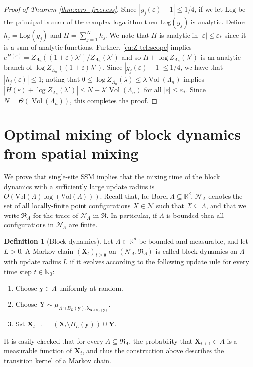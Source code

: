 \documentclass[10pt]{amsart}
\theoremstyle{definition}
\newtheorem{definition}[theorem]{Definition}
\theoremstyle{remark}
\def\eps{{\varepsilon}}
\newcommand{\pointsets}{\mathcal{N}}
\newcommand{\events}{\mathfrak{R}}
\newcommand{\bX}{\mathbf{X}}
\newcommand{\bY}{\mathbf{Y}}
\newcommand{\Vol}{\operatorname{Vol}}
\newcommand{\N}{\mathbb{N}}
\newcommand{\R}{\mathbb{R}}
\newcommand{\region}{\Lambda}
\newcommand{\activities}{\pmb{\lambda}}
\newcommand{\vol}{\mathrm{Vol}}
\newcommand{\randpoint}{\mathbf{y}}
\begin{document}
\begin{proof}[Proof of Theorem \ref{thm:zero_freeness}]
		Since $|g_j(\eps) - 1| \leq 1/4$, if we let $\mathrm{Log}$ be the principal branch of the complex logarithm then $\mathrm{Log}(g_j)$ is analytic. Define $h_j = \mathrm{Log}(g_j)$ and $H = \sum_{j = 1}^N h_j$.  We note that $H$ is analytic in $|\eps| \leq \eps_\ast$ since it is a sum of analytic functions.  Further, \eqref{eq:Z-telescope} implies $e^{H(\eps)}  =Z_{\Lambda_n}((1 + \eps)\lambda')/Z_{\Lambda_n}(\lambda')$ and so $H + \log Z_{\Lambda_n}(\lambda')$ is an analytic branch of $\log Z_{\Lambda_n}((1 + \eps)\lambda')$.  Since $|g_j(\eps) - 1| \leq 1/4$, we have that $|h_j(\eps)| \leq 1$; noting that $0 \leq \log Z_{\Lambda_n}(\lambda) \leq \lambda \Vol(\Lambda_n)$ implies $|H(\eps) + \log Z_{\Lambda_n}(\lambda')| \leq N + \lambda'\Vol(\Lambda_n)$ for all $|\eps| \leq \eps_\ast$.  Since $N = \Theta(\Vol(\Lambda_n))$, this completes the proof.
	\end{proof}
	
	\section{Optimal mixing of block dynamics from spatial mixing}\label{sec:block-dynamics}
	We prove that single-site SSM implies that the mixing time of the block dynamics with a sufficiently large update radius is $O(\vol(\region) \log(\vol(\region)))$.  
	Recall that, for Borel $\region \subseteq \R^d$, $\pointsets_{\region}$ denotes the set of all locally-finite point configurations $X \in \pointsets$ such that $X \subseteq \Lambda$, and that we write $\events_{\region}$ for the trace of $\pointsets_{\region}$ in $\events$.
	In particular, if $\region$ is bounded then all configurations in $\pointsets_{\region}$ are finite.
	
	
	
	
	\begin{definition}[Block dynamics] \label{def:block_dynamics}
		Let $\region \subset \R^d$ be bounded and measurable, and let $L > 0$.
		A Markov chain $(\bX_t)_{t \ge 0}$ on $(\pointsets_{\region}, \events_{\region})$ is called block dynamics on $\region$ with update radius $L$ if it evolves according to the following update rule for every time step $t \in \N_0$:
		\begin{enumerate}
			\item Choose $\randpoint \in \region$ uniformly at random.
			\item Choose $\bY \sim \mu_{\region \cap B_L(\randpoint), \activities_{\bX_t \setminus B_L(\randpoint)}}$.
			\item Set $\bX_{t+1} = (\bX_t \setminus B_L(\randpoint)) \cup \bY$.
		\end{enumerate}
	\end{definition}
	It is easily checked that for every $A \subseteq \events_{\region}$, the probability that $\bX_{t+1} \in A$ is a measurable function of $\bX_t$, and thus the construction above describes the transition kernel of a Markov chain.
	
\end{document}
